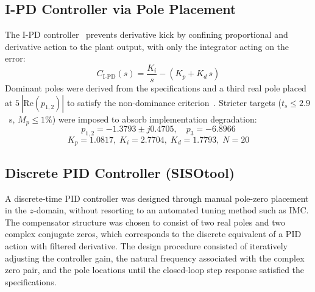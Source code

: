 \documentclass[conference]{IEEEtran}
\begin{document}
\subsection{I-PD Controller via Pole Placement}
The I-PD controller~\cite{visioli2006} prevents
derivative kick by confining proportional and derivative
action to the plant output, with only the integrator
acting on the error:
\begin{equation}
  C_{\text{I-PD}}(s) = \frac{K_i}{s} - \left(K_p + K_d\,s\right)
\end{equation}
Dominant poles were derived from the specifications
and a third real pole placed at $5\,|\text{Re}(p_{1,2})|$
to satisfy the non-dominance criterion~\cite{ogata2010}.
Stricter targets ($t_s \leq 2.9$~s, $M_p \leq 1\%$)
were imposed to absorb implementation degradation:
\[
p_{1,2} = -1.3793 \pm j0.4705,\quad p_3 = -6.8966
\]
\[
K_p = 1.0817,\; K_i = 2.7704,\; K_d = 1.7793,\; N = 20
\]



\subsection{Discrete PID Controller (SISOtool)}
A discrete-time PID controller was designed through manual pole-zero placement in the
$z$-domain, without resorting to an automated tuning method such as IMC. The compensator
structure was chosen to consist of two real poles and two complex conjugate zeros, which
corresponds to the discrete equivalent of a PID action with filtered derivative. The design
procedure consisted of iteratively adjusting the controller gain, the natural frequency
associated with the complex zero pair, and the pole locations until the closed-loop step
response satisfied the specifications.
\end{document}
